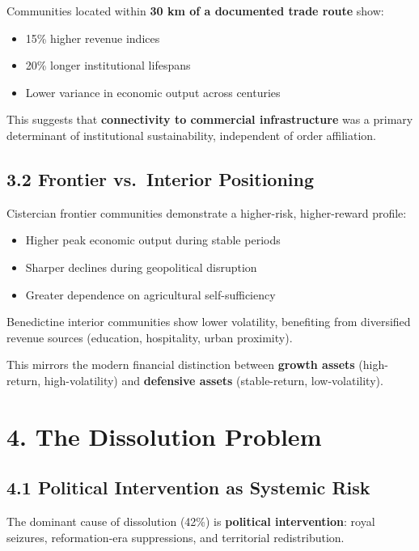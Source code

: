 \documentclass[
  11pt,
  a4paper,
]{article}
\providecommand{\tightlist}{%
  \setlength{\itemsep}{0pt}\setlength{\parskip}{0pt}}\usepackage{longtable,booktabs,array}
\begin{document}
Communities located within \textbf{30 km of a documented trade route}
show:

\begin{itemize}
\tightlist
\item
  15\% higher revenue indices
\item
  20\% longer institutional lifespans
\item
  Lower variance in economic output across centuries
\end{itemize}

This suggests that \textbf{connectivity to commercial infrastructure}
was a primary determinant of institutional sustainability, independent
of order affiliation.

\subsection{3.2 Frontier vs.~Interior
Positioning}\label{frontier-vs.-interior-positioning}

Cistercian frontier communities demonstrate a higher-risk, higher-reward
profile:

\begin{itemize}
\tightlist
\item
  Higher peak economic output during stable periods
\item
  Sharper declines during geopolitical disruption
\item
  Greater dependence on agricultural self-sufficiency
\end{itemize}

Benedictine interior communities show lower volatility, benefiting from
diversified revenue sources (education, hospitality, urban proximity).

This mirrors the modern financial distinction between \textbf{growth
assets} (high-return, high-volatility) and \textbf{defensive assets}
(stable-return, low-volatility).

\section{4. The Dissolution Problem}\label{the-dissolution-problem}

\subsection{4.1 Political Intervention as Systemic
Risk}\label{political-intervention-as-systemic-risk}

The dominant cause of dissolution (42\%) is \textbf{political
intervention}: royal seizures, reformation-era suppressions, and
territorial redistribution.
\end{document}
